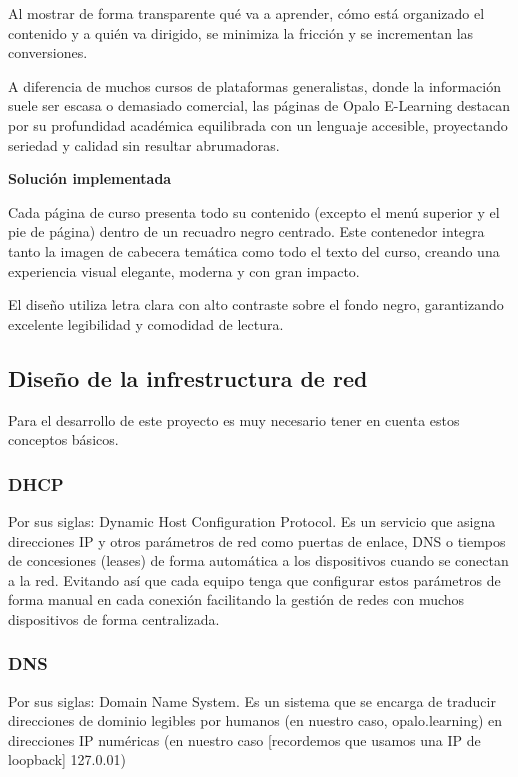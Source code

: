 \documentclass[11.5pt]{article}
\begin{document}
	Al mostrar de forma transparente qué va a aprender, cómo está organizado el contenido y a quién va dirigido, se minimiza la fricción y se incrementan las conversiones.
	
	A diferencia de muchos cursos de plataformas generalistas, donde la información suele ser escasa o demasiado comercial, las páginas de Opalo E-Learning destacan por su profundidad académica equilibrada con un lenguaje accesible, proyectando seriedad y calidad sin resultar abrumadoras.
	
	\noindent\textbf{{\large Solución implementada}}
	
	Cada página de curso presenta todo su contenido (excepto el menú superior y el pie de página) dentro de un recuadro negro centrado. Este contenedor integra tanto la imagen de cabecera temática como todo el texto del curso, creando una experiencia visual elegante, moderna y con gran impacto.
	
	El diseño utiliza letra clara con alto contraste sobre el fondo negro, garantizando excelente legibilidad y comodidad de lectura.
	
	\subsection{Diseño de la infrestructura de red}
	
	Para el desarrollo de este proyecto es muy necesario tener en cuenta estos conceptos básicos.
	
	\subsubsection{DHCP}
	
	Por sus siglas: Dynamic Host Configuration Protocol. Es un servicio que asigna direcciones IP y otros
	parámetros de red como puertas de enlace, DNS o tiempos de concesiones (leases) de forma automática a
	los dispositivos cuando se conectan a la red. Evitando así que cada equipo tenga que configurar estos
	parámetros de forma manual en cada conexión facilitando la gestión de redes con muchos dispositivos de
	forma centralizada.
	
	\subsubsection{DNS}
	
	Por sus siglas: Domain Name System. Es un sistema que se encarga de traducir direcciones de dominio
	legibles por humanos (en nuestro caso, opalo.learning) en direcciones IP numéricas (en nuestro caso
	[recordemos que usamos una IP de loopback] 127.0.01)
	
\end{document}
